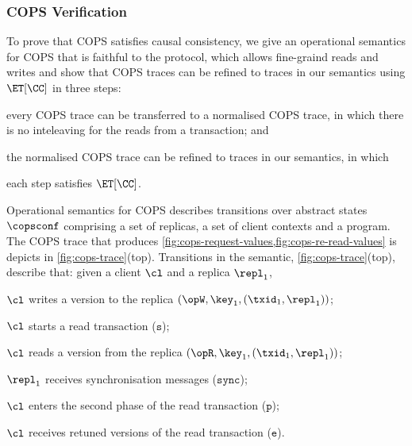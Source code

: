 \subsubsection{COPS Verification} To prove that COPS satisfies causal consistency,
we give an operational semantics for COPS that is faithful to the protocol, which allows fine-graind reads and writes
and show that COPS traces can be refined to traces in our semantics using \( \ET[\CC] \) in three steps:
\begin{enumerate*}
\item every COPS trace can be transferred to a normalised COPS trace, 
in which there is no inteleaving for the reads from a transaction; and
\item the normalised COPS trace can be refined to traces in our semantics, in which \item each step satisfies \( \ET[\CC] \).
\end{enumerate*}

Operational semantics for COPS 
describes transitions over abstract states \( \copsconf \) comprising a set of replicas,
a set of client contexts and a program.
The COPS trace that produces \cref{fig:cops-request-values,fig:cops-re-read-values} is depicts in \cref{fig:cops-trace}(top).
Transitions in the semantic, \eg \cref{fig:cops-trace}(top), describe that:
given a client \(\cl\) and a replica \( \repl_1 \),
\begin{enumerate*}
\item \( \cl \) writes a version to the replica \( (\opW,\key_1, (\txid_1,\repl_1)) \);
\item \( \cl \) starts a read transaction (\( \mathtt{s} \));
\item \( \cl \) reads a version from the replica \( (\opR,\key_1, (\txid_1,\repl_1)) \);
\item \( \repl_1 \) receives synchronisation messages (\(\mathtt{sync}\));
\item \( \cl \) enters the second phase of the read transaction (\(\mathtt{p}\));
\item \( \cl \) receives retuned versions of the read transaction (\(\mathtt{e}\)).
\end{enumerate*}



